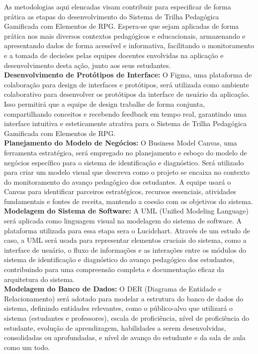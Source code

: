 As metodologias aqui elencadas visam contribuir para especificar de forma prática as etapas do desenvolvimento do Sistema de Trilha Pedagógica Gamificada com Elementos de RPG. Espera-se que sejam aplicadas de forma prática nos mais diversos contextos pedagógicos e educacionais, armazenando e apresentando dados de forma acessível e informativa, facilitando o monitoramento e a tomada de decisões pelas equipes docentes envolvidas na aplicação e desenvolvimento desta ação, junto aos seus estudantes.
\\

\textbf{Desenvolvimento de Protótipos de Interface:} O Figma, uma plataforma de colaboração para design de interfaces e protótipos, será utilizada como ambiente colaborativo para desenvolver os protótipos da interface de usuário da aplicação. Isso permitirá que a equipe de design trabalhe de forma conjunta, compartilhando conceitos e recebendo feedback em tempo real, garantindo uma interface intuitiva e esteticamente atrativa para o Sistema de Trilha Pedagógica Gamificada com Elementos de RPG.
\\

\textbf{Planejamento do Modelo de Negócios:} O Business Model Canvas, uma ferramenta estratégica, será empregado no planejamento e esboço do modelo de negócios específico para o sistema de identificação e diagnóstico. Será utilizado para criar um modelo visual que descreva como o projeto se encaixa no contexto do monitoramento do avanço pedagógico dos estudantes. A equipe usará o Canvas para identificar parceiros estratégicos, recursos essenciais, atividades fundamentais e fontes de receita, mantendo a coesão com os objetivos do sistema.
\\

\textbf{Modelagem do Sistema de Software:} A UML (Unified Modeling Language) será aplicada como linguagem visual na modelagem do sistema de software. A plataforma utilizada para essa etapa sera o Lucidchart. Através de um estudo de caso, a UML será usada para representar elementos cruciais do sistema, como a interface de usuário, o fluxo de informações e as interações entre os módulos do sistema de identificação e diagnóstico do avanço pedagógico dos estudantes, contribuindo para uma compreensão completa e documentação eficaz da arquitetura do sistema.
\\

\textbf{Modelagem do Banco de Dados:} O DER (Diagrama de Entidade e Relacionamento) será adotado para modelar a estrutura do banco de dados do sistema, definindo entidades relevantes, como o público-alvo que utilizará o sistema (estudantes e professores), escala de proficiência, nível de proficiência do estudante, evolução de aprendizagem, habilidades a serem desenvolvidas, consolidadas ou aprofundadas, e nível de avanço do estudante e da sala de aula como um todo.
\\

